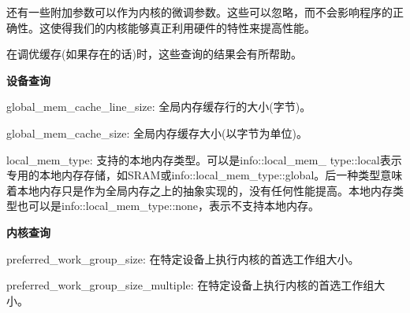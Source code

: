 还有一些附加参数可以作为内核的微调参数。这些可以忽略，而不会影响程序的正确性。这使得我们的内核能够真正利用硬件的特性来提高性能。\par

\begin{tcolorbox}[colback=red!5!white,colframe=red!75!black]
在调优缓存(如果存在的话)时，这些查询的结果会有所帮助。
\end{tcolorbox}

\hspace*{\fill} \par %
\textbf{设备查询}

global\_mem\_cache\_line\_size: 全局内存缓存行的大小(字节)。\par

global\_mem\_cache\_size: 全局内存缓存大小(以字节为单位)。\par

local\_mem\_type: 支持的本地内存类型。可以是info::local\_mem\_
type::local表示专用的本地内存存储，如SRAM或info::local\_mem\_type::global。后一种类型意味着本地内存只是作为全局内存之上的抽象实现的，没有任何性能提高。本地内存类型也可以是info::local\_mem\_type::none，表示不支持本地内存。\par

\hspace*{\fill} \par %
\textbf{内核查询}

preferred\_work\_group\_size: 在特定设备上执行内核的首选工作组大小。\par

preferred\_work\_group\_size\_multiple: 在特定设备上执行内核的首选工作组大小。\par
















































